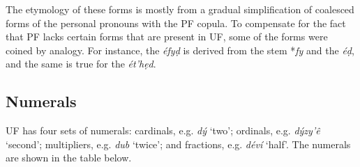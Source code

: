 \documentclass[a4paper, 12pt, twoside, final]{article}
\let \w \textit
\begin{document}
The etymology of these forms is mostly from a gradual simplification of coalesced forms of the personal
pronouns with the PF copula. To compensate for the fact that PF lacks certain forms that are present in UF, some
of the forms were coined by analogy. For instance, the  \w{éfyḍ} is derived from the 
stem *\w{fy} and the  \w{éḍ}, and the same is true for the  \w{ét’hẹd}.

\subsection{Numerals}\label{subsec:numerals}
UF has four sets of numerals: cardinals, e.g. \w{dý} ‘two’; ordinals, e.g. \w{dýzy’ê} ‘second’; multipliers, e.g. \w{dub}
‘twice’; and fractions, e.g. \w{déví} ‘half’. The numerals are shown in the table below.
\end{document}
